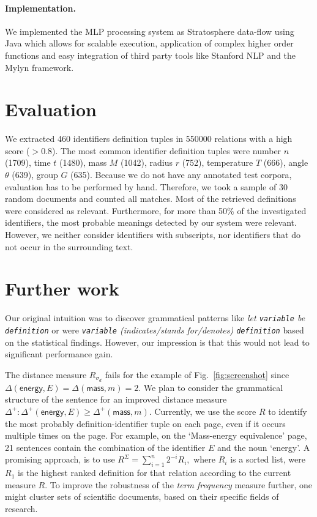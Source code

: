\documentclass[runningheads]{llncs}
\begin{document}
\paragraph{Implementation.}
We implemented the MLP processing system \cite{github} as Stratosphere data-flow using Java which allows for scalable execution, application of complex higher order functions and easy integration of third party tools like Stanford NLP and the Mylyn framework.
\section{Evaluation}
We extracted 460 identifiers definition tuples in 550000 relations with a
high score ($>0.8$).  The most common identifier definition tuples were 
number $n$ (1709), time $t$ (1480), mass $M$ (1042), radius $r$ (752), 
temperature $T$ (666), angle $\theta$ (639), group $G$ (635).
Because we do not have any annotated test corpora,
evaluation has to be performed by hand.
Therefore, we took a sample of 30
random documents and counted all matches.
Most of the retrieved definitions were considered as relevant.
Furthermore, for more than 50\% of the investigated identifiers, 
the most probable meanings detected by our system were relevant.
However, we neither consider identifiers with subscripts, nor identifiers that do not occur in the surrounding text.  



\section{Further work}
Our original intuition was to discover grammatical patterns 
like \emph{let \texttt{variable} be \texttt{definition}} or 
were \emph{\texttt{variable} (indicates/stands for/denotes) \texttt{definition}} based on the statistical findings.
However, our impression is that this 
would not lead to significant performance gain.

The distance measure
$R_{\sigma_d}$
fails for the example of Fig.~\ref{fig:screenshot} since
$\Delta(\mathsf{energy},E)=\Delta(\mathsf{mass},m)=2$.
We plan to consider the grammatical structure of the sentence for an improved distance measure $\Delta^{+} : \Delta^+(\mathsf{energy},E)\ge\Delta^+(\mathsf{mass},m)$.
Currently, we use the score $R$ to identify the most probably definition-identifier tuple on each page, even if it occurs multiple times on the page.
For example, on the `Mass-energy equivalence' page, 21 sentences contain the combination of the identifier $E$ and the noun `energy'.
A promising approach, is to use $R^\Sigma=\sum_{i=1}^n 2^{-i} R_i,$ where $R_i$ is a 
sorted list, were $R_1$ is the highest ranked definition for that relation according to the current measure $R$.
To improve the robustness of the \emph{term frequency} measure further, one
might cluster sets of scientific documents, based on their specific fields of
research.
\end{document}
